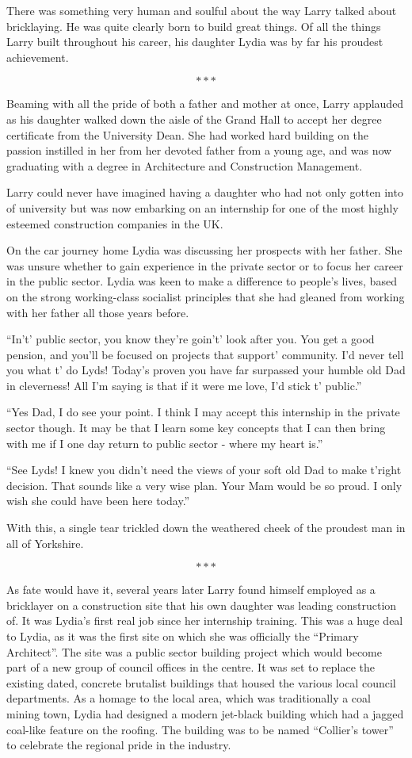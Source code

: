 There was something very human and soulful about the way Larry talked
about bricklaying. He was quite clearly born to build great things. Of
all the things Larry built throughout his career, his daughter Lydia
was by far his proudest achievement.

\[***\]

Beaming with all the pride of both a father and mother at once, Larry
applauded as his daughter walked down the aisle of the Grand Hall to
accept her degree certificate from the University Dean. She had worked
hard building on the passion instilled in her from her devoted father
from a young age, and was now graduating with a degree in Architecture
and Construction Management.

Larry could never have imagined having a daughter who had not only
gotten into of university but was now embarking on an internship for
one of the most highly esteemed construction companies in the UK.

On the car journey home Lydia was discussing her prospects with her
father. She was unsure whether to gain experience in the private
sector or to focus her career in the public sector. Lydia was keen to
make a difference to people's lives, based on the strong working-class
socialist principles that she had gleaned from working with her father
all those years before.

“In’t’ public sector, you know they're goin’t’ look after you. You get
a good pension, and you’ll be focused on projects that support’
community. I’d never tell you what t’ do Lyds! Today’s proven you have
far surpassed your humble old Dad in cleverness! All I'm saying is
that if it were me love, I’d stick t’ public.”

“Yes Dad, I do see your point. I think I may accept this internship in
the private sector though. It may be that I learn some key concepts
that I can then bring with me if I one day return to public sector -
where my heart is.”

“See Lyds! I knew you didn't need the views of your soft old Dad to
make t’right decision. That sounds like a very wise plan. Your Mam
would be so proud. I only wish she could have been here today.”

With this, a single tear trickled down the weathered cheek of the
proudest man in all of Yorkshire.

\[***\]

As fate would have it, several years later Larry found himself
employed as a bricklayer on a construction site that his own daughter
was leading construction of. It was Lydia's first real job since her
internship training.  This was a huge deal to Lydia, as it was the
first site on which she was officially the “Primary Architect”. The
site was a public sector building project which would become part of a
new group of council offices in the centre. It was set to replace the
existing dated, concrete brutalist buildings that housed the various
local council departments. As a homage to the local area, which was
traditionally a coal mining town, Lydia had designed a modern
jet-black building which had a jagged coal-like feature on the
roofing. The building was to be named “Collier’s tower” to celebrate
the regional pride in the industry.

